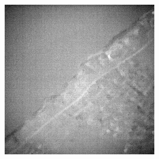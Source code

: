 \documentclass[10pt,twocolumn,letterpaper]{article}
\begin{document}
\begin{figure}[!ht]
\begin{subfigure}[b]{0.19\textwidth}
  \end{subfigure}
  \hfill
  \begin{subfigure}[b]{0.19\textwidth}
      \centering
      \includegraphics[width=\textwidth]{../figs/outputs/mono/1231.png}
  \end{subfigure}   
  

\end{figure}
\end{document}
